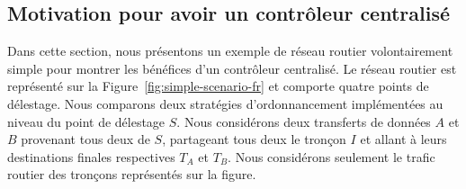  
\subsection{Motivation pour avoir un contrôleur centralisé} 
\label{sec:scenario-simple-fr} 
 
 
Dans cette section, nous présentons un exemple de réseau routier volontairement simple pour montrer les bénéfices d’un contrôleur centralisé. Le réseau routier est représenté sur la Figure~\ref{fig:simple-scenario-fr} et comporte quatre points de délestage. Nous comparons deux stratégies d’ordonnancement implémentées au niveau du point de délestage $S$. Nous considérons deux transferts de données $A$ et $B$ provenant tous deux de $S$, partageant tous deux le tronçon $I$ et allant à leurs destinations finales respectives $T_A$ et $T_B$. Nous considérons seulement le trafic routier des tronçons représentés sur la figure. 
 

